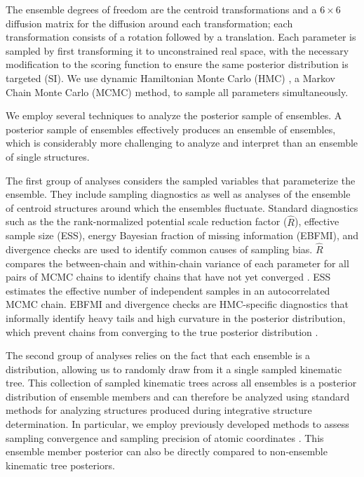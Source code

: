 \documentclass[../main.tex]{subfiles}
\begin{document}
\begin{refsection}
The ensemble degrees of freedom are the centroid transformations and a $6 \times 6$ diffusion matrix for the diffusion around each transformation; each transformation consists of a rotation followed by a translation.
Each parameter is sampled by first transforming it to unconstrained real space, with the necessary modification to the scoring function to ensure the same posterior distribution is targeted (SI).
We use dynamic Hamiltonian Monte Carlo (HMC) \cite{betancourt_geometric_2014,betancourt_conceptual_2018}, a Markov Chain Monte Carlo (MCMC) method, to sample all parameters simultaneously.

We employ several techniques to analyze the posterior sample of ensembles.
A posterior sample of ensembles effectively produces an ensemble of ensembles, which is considerably more challenging to analyze and interpret than an ensemble of single structures.

The first group of analyses considers the sampled variables that parameterize the ensemble.
They include sampling diagnostics as well as analyses of the ensemble of centroid structures around which the ensembles fluctuate.
Standard diagnostics such as the the rank-normalized potential scale reduction factor ($\hat{R}$), effective sample size (ESS), energy Bayesian fraction of missing information (EBFMI), and divergence checks are used to identify common causes of sampling bias.
$\hat{R}$ compares the between-chain and within-chain variance of each parameter for all pairs of MCMC chains to identify chains that have not yet converged \cite{vehtari_rank-normalization_2020}.
ESS estimates the effective number of independent samples in an autocorrelated MCMC chain.
EBFMI and divergence checks are HMC-specific diagnostics that informally identify heavy tails and high curvature in the posterior distribution, which prevent chains from converging to the true posterior distribution \cite{betancourt_diagnosing_2016,betancourt_hamiltonian_2013}.

The second group of analyses relies on the fact that each ensemble is a distribution, allowing us to randomly draw from it a single sampled kinematic tree.
This collection of sampled kinematic trees across all ensembles is a posterior distribution of ensemble members and can therefore be analyzed using standard methods for analyzing structures produced during integrative structure determination.
In particular, we employ previously developed methods to assess sampling convergence and sampling precision of atomic coordinates \cite{viswanath_assessing_2017}.
This ensemble member posterior can also be directly compared to non-ensemble kinematic tree posteriors.


\end{refsection}
\end{document}
